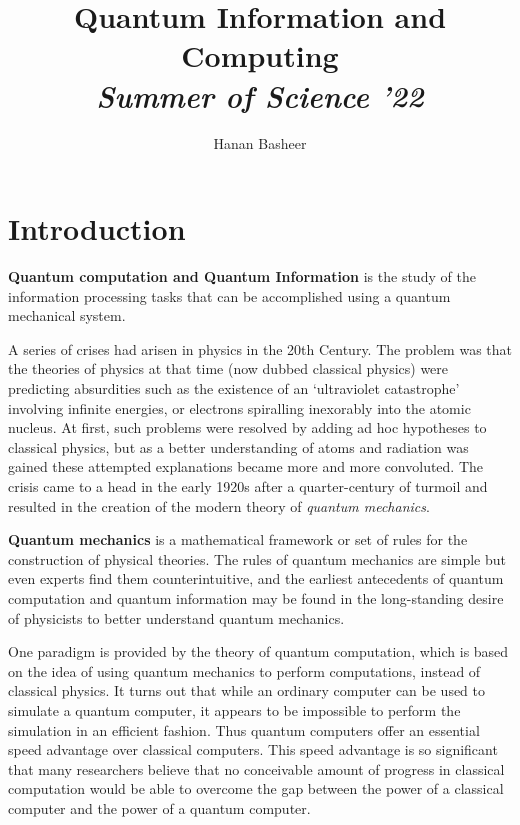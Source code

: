 \documentclass[20pt]{report}
\begin{document}
\begin{titlepage}
\author{\Large Hanan Basheer} 
\title{Quantum Information and Computing\\
\textit{\Large Summer of Science '22}} 
\date{}
\maketitle
\end{titlepage}

\tableofcontents{}

\part{Introduction}
\textbf{Quantum computation and Quantum Information} is the study of the information processing tasks that can be accomplished using a quantum mechanical system. 
\par A series of crises had arisen in physics in the 20th Century. The problem was that the theories of physics at that time (now dubbed classical physics) were predicting absurdities such as the existence of an ‘ultraviolet catastrophe’ involving infinite energies, or electrons spiralling inexorably into the atomic nucleus. At first, such problems were resolved by adding ad hoc hypotheses to classical physics, but as a better understanding of atoms and radiation was gained these attempted explanations became more and more convoluted. The crisis came to a head in the early 1920s after a quarter-century of turmoil and resulted in the creation of the modern theory of \textit{quantum mechanics}.
\par
\textbf{Quantum mechanics} is a mathematical framework or set of rules for the construction of physical theories. The rules of quantum mechanics are simple but even experts find them counterintuitive, and the earliest antecedents of quantum computation and quantum information may be found in the long-standing desire of physicists to better understand quantum mechanics. 
\par One paradigm is provided by the theory of quantum computation, which is based on the idea of using quantum mechanics to perform computations, instead of classical physics. It turns out that while an ordinary computer can be used to simulate a quantum computer, it appears to be impossible to perform the simulation in an efficient fashion. Thus quantum computers offer an essential speed advantage over classical computers. This speed advantage is so significant that many researchers believe that no conceivable amount of progress in classical computation would be able to overcome the gap between the power of a classical computer and the power of a quantum computer.
\end{document}
